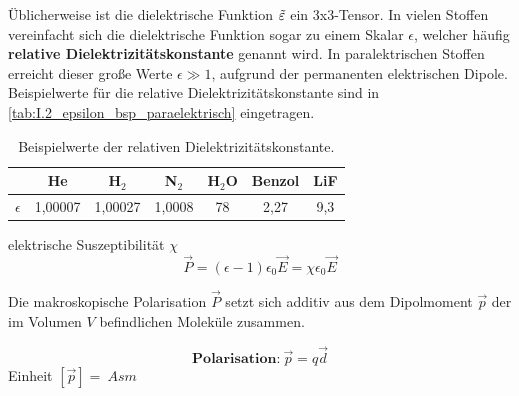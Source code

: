     Üblicherweise ist die dielektrische Funktion $\tilde{\varepsilon}$ ein 3x3-Tensor. In vielen Stoffen vereinfacht sich die dielektrische Funktion sogar zu einem Skalar $\epsilon$, welcher häufig \textbf{relative Dielektrizitätskonstante} genannt wird. In paralektrischen Stoffen erreicht dieser große Werte $\epsilon\gg1$, aufgrund der permanenten elektrischen Dipole. Beispielwerte für die relative Dielektrizitätskonstante sind in \autoref{tab:I.2_epsilon_bsp_paraelektrisch} eingetragen.
    \begin{table}[H]
        \centering
        \caption{Beispielwerte der relativen Dielektrizitätskonstante.}
        \begin{tabular}{|l||cccccc|}\hline
             &He&H${}_2$&N${}_2$&H${}_2$O&Benzol&LiF \\\hline
             $\epsilon$&1,00007&1,00027&1,0008&78&2,27&9,3\\\hline
        \end{tabular}
        \label{tab:I.2_epsilon_bsp_paraelektrisch}
    \end{table}
    \begin{definition}{elektrische Suszeptibilität $\chi$}
        \begin{equation}
            \vec P = (\epsilon-1)\epsilon_0\vec E = \chi\epsilon_0\vec E
            \label{eq:2.3}
        \end{equation}
    \end{definition}
    Die makroskopische Polarisation $\vec P$ setzt sich additiv aus dem Dipolmoment $\vec p$ der im Volumen $V$ befindlichen Moleküle zusammen.\\
    \begin{minipage}{0.6\linewidth}\vspace{3em}\hspace{1em}
        \centering
        
        \label{fig:vl02_dipol}
    \end{minipage}
    \begin{minipage}{0.4\linewidth}
        \begin{important}
            \begin{equation}
                \textbf{Polarisation:}~{\vec p= q\vec d}
            \end{equation}
            Einheit $[\vec p]=\SI{}{Asm}$
        \end{important}
    \end{minipage}

